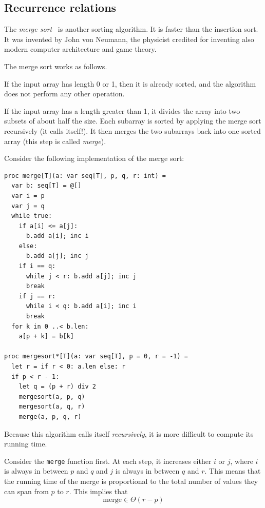 \documentclass[justified, sixbynine]{tufte-book}
\def\ft{\small\tt}
\theoremstyle{plain}%
\newtheorem * {corollary}{Corollary}
\theoremstyle{definition}
\theoremstyle{remark}
\newtheorem * {remark}{Remark}
\newtheorem * {note}{Note}
\begin{document}
\begin{fullwidth}
\goodbreak\section{Recurrence relations}



The {\it merge sort}~\cite{mergesort} is another sorting algorithm. It is faster than the insertion sort. It was invented by John von Neumann, the physicist credited for inventing also modern computer architecture and game theory.

The merge sort works as follows.

If the input array has length 0 or 1, then it is already sorted, and the algorithm does not perform any other operation.

If the input array has a length greater than 1, it divides the array into two subsets of about half the size. Each subarray is sorted by applying the merge sort recursively (it calls itself!). It then merges the two subarrays back into one sorted array (this step is called {\it merge}).

Consider the following implementation of the merge sort:

\begin{lstlisting}
proc merge[T](a: var seq[T], p, q, r: int) =
  var b: seq[T] = @[]
  var i = p
  var j = q
  while true:
    if a[i] <= a[j]:
      b.add a[i]; inc i
    else:
      b.add a[j]; inc j
    if i == q:
      while j < r: b.add a[j]; inc j
      break
    if j == r:
      while i < q: b.add a[i]; inc i
      break
  for k in 0 ..< b.len:
    a[p + k] = b[k]

proc mergesort*[T](a: var seq[T], p = 0, r = -1) =
  let r = if r < 0: a.len else: r
  if p < r - 1:
    let q = (p + r) div 2
    mergesort(a, p, q)
    mergesort(a, q, r)
    merge(a, p, q, r)
\end{lstlisting}


Because this algorithm calls itself {\it recursively}, it is more difficult to compute its running time.

Consider the {\ft merge} function first. At each step, it increases either $i$ or $j$, where $i$ is always in between $p$ and $q$ and $j$ is always in between $q$ and $r$. This means that the running time of the merge is proportional to the total number of values they can span from $p$ to $r$. This implies that
\begin{equation}
\textrm{merge} \in \Theta(r-p)
\end{equation}


\end{fullwidth}
\end{document}
